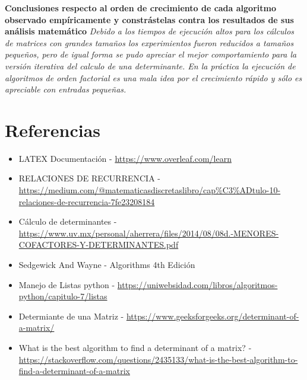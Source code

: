 \documentclass{article}
\begin{document}
\begin{question}
  \textbf{Conclusiones respecto al orden de crecimiento de cada algoritmo observado empíricamente y constrástelas contra los resultados de sus análisis matemático}
  \textit{Debido a los tiempos de ejecución altos para los cálculos de matrices con grandes tamaños los experimientos fueron reducidos a tamaños pequeños, pero de igual forma se pudo apreciar el mejor comportamiento para la versión iterativa del calculo de una determinante. En la práctica la ejecución de algoritmos de orden factorial es una mala idea por el crecimiento rápido y sólo es apreciable con entradas pequeñas.}
\end{question}

\section{Referencias}

\begin{itemize}
\item LATEX Documentación - \url{https://www.overleaf.com/learn}
\item RELACIONES DE RECURRENCIA - \url{https://medium.com/@matematicasdiscretaslibro/cap%C3%ADtulo-10-relaciones-de-recurrencia-7fe23208184}
\item Cálculo de determinantes - \url{https://www.uv.mx/personal/aherrera/files/2014/08/08d.-MENORES-COFACTORES-Y-DETERMINANTES.pdf}
\item Sedgewick And Wayne - Algorithms 4th Edición
\item Manejo de Listas python - \url{https://uniwebsidad.com/libros/algoritmos-python/capitulo-7/listas}
\item Determiante de una Matriz - \url{https://www.geeksforgeeks.org/determinant-of-a-matrix/}
\item What is the best algorithm to find a determinant of a matrix? - \url{https://stackoverflow.com/questions/2435133/what-is-the-best-algorithm-to-find-a-determinant-of-a-matrix}

\end{itemize}
\end{document}
